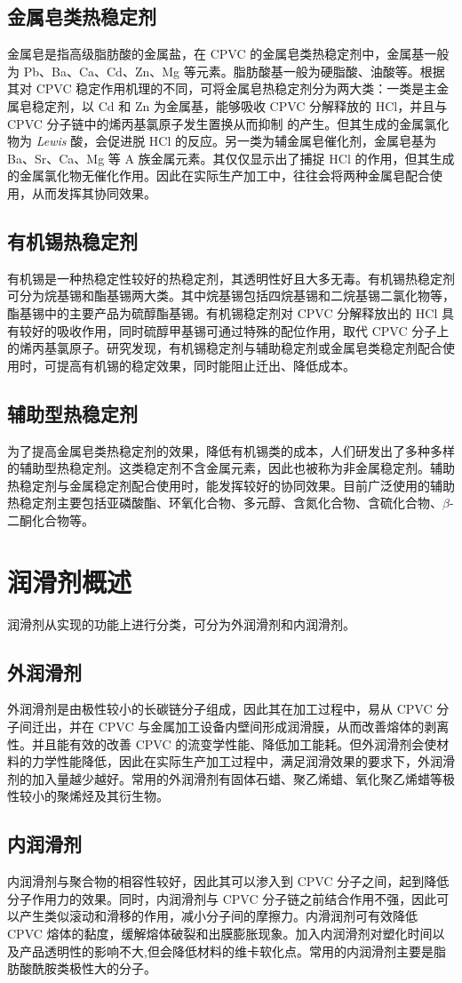 \subsection{金属皂类热稳定剂}
金属皂是指高级脂肪酸的金属盐，在 CPVC 的金属皂类热稳定剂中，金属基一般为 Pb、Ba、Ca、Cd、Zn、Mg 等元素。脂肪酸基一般为硬脂酸、油酸等。根据其对 CPVC 稳定作用机理的不同，可将金属皂热稳定剂分为两大类：一类是主金属皂稳定剂，以 Cd 和 Zn 为金属基，能够吸收 CPVC 分解释放的 HCl，并且与 CPVC 分子链中的烯丙基氯原子发生置换从而抑制 \; 的产生。但其生成的金属氯化物为 \textit{Lewis} 酸，会促进脱 HCl 的反应。另一类为辅金属皂催化剂，金属皂基为 Ba、Sr、Ca、Mg 等 \uppercase\expandafter{}A 族金属元素。其仅仅显示出了捕捉 HCl 的作用，但其生成的金属氯化物无催化作用。因此在实际生产加工中，往往会将两种金属皂配合使用，从而发挥其协同效果。

\subsection{有机锡热稳定剂}

有机锡是一种热稳定性较好的热稳定剂，其透明性好且大多无毒。有机锡热稳定剂可分为烷基锡和酯基锡两大类。其中烷基锡包括四烷基锡和二烷基锡二氯化物等，酯基锡中的主要产品为硫醇酯基锡。有机锡稳定剂对 CPVC 分解释放出的 HCl 具有较好的吸收作用，同时硫醇甲基锡可通过特殊的配位作用，取代 CPVC 分子上的烯丙基氯原子\cite{29}。研究发现，有机锡稳定剂与辅助稳定剂或金属皂类稳定剂配合使用时，可提高有机锡的稳定效果，同时能阻止迁出、降低成本\cite{30}。

\subsection{辅助型热稳定剂}
为了提高金属皂类热稳定剂的效果，降低有机锡类的成本，人们研发出了多种多样的辅助型热稳定剂。这类稳定剂不含金属元素，因此也被称为非金属稳定剂。辅助热稳定剂与金属稳定剂配合使用时，能发挥较好的协同效果。目前广泛使用的辅助热稳定剂主要包括亚磷酸酯、环氧化合物、多元醇、含氮化合物、含硫化合物、$\beta$-二酮化合物等\cite{26}。

\section{润滑剂概述}

润滑剂从实现的功能上进行分类，可分为外润滑剂和内润滑剂。

\subsection{外润滑剂}
外润滑剂是由极性较小的长碳链分子组成，因此其在加工过程中，易从 CPVC 分子间迁出，并在 CPVC 与金属加工设备内壁间形成润滑膜，从而改善熔体的剥离性。并且能有效的改善 CPVC 的流变学性能、降低加工能耗。但外润滑剂会使材料的力学性能降低，因此在实际生产加工过程中，满足润滑效果的要求下，外润滑剂的加入量越少越好。常用的外润滑剂有固体石蜡、聚乙烯蜡、氧化聚乙烯蜡等极性较小的聚烯烃及其衍生物。

\subsection{内润滑剂}
内润滑剂与聚合物的相容性较好，因此其可以渗入到 CPVC 分子之间，起到降低分子作用力的效果。同时，内润滑剂与 CPVC 分子链之前结合作用不强，因此可以产生类似滚动和滑移的作用，减小分子间的摩擦力。内滑润剂可有效降低 CPVC 熔体的黏度，缓解熔体破裂和出膜膨胀现象。加入内润滑剂对塑化时间以及产品透明性的影响不大,但会降低材料的维卡软化点。常用的内润滑剂主要是脂肪酸酰胺类极性大的分子。
